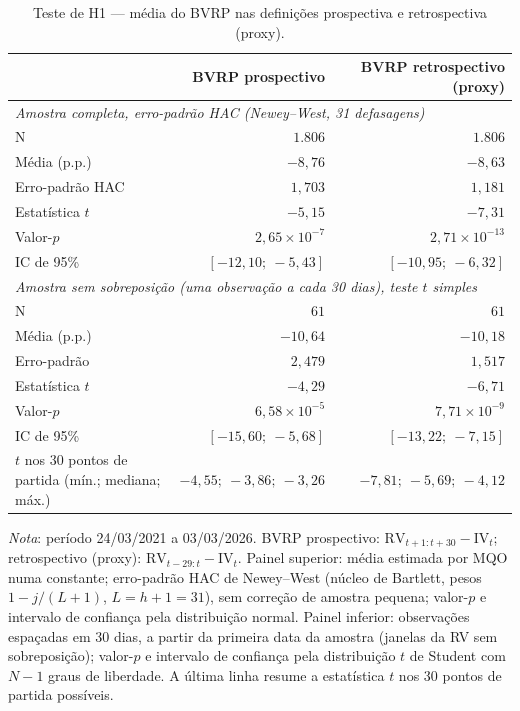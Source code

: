 \begin{table}[H]
\centering
\small
\caption{Teste de H1 --- média do BVRP nas definições prospectiva e retrospectiva (proxy).}
\label{tab:h1-teste-media}
\begin{tabular}{lrr}
\toprule
 & BVRP prospectivo & BVRP retrospectivo (proxy) \\
\midrule
\multicolumn{3}{l}{\textit{Amostra completa, erro-padrão HAC (Newey--West, 31 defasagens)}} \\
N & $1{.}806$ & $1{.}806$ \\
Média (p.p.) & $-8{,}76$ & $-8{,}63$ \\
Erro-padrão HAC & $1{,}703$ & $1{,}181$ \\
Estatística $t$ & $-5{,}15$ & $-7{,}31$ \\
Valor-$p$ & $2{,}65 \times 10^{-7}$ & $2{,}71 \times 10^{-13}$ \\
IC de 95\% & $[-12{,}10;\ -5{,}43]$ & $[-10{,}95;\ -6{,}32]$ \\
\midrule
\multicolumn{3}{l}{\textit{Amostra sem sobreposição (uma observação a cada 30 dias), teste $t$ simples}} \\
N & $61$ & $61$ \\
Média (p.p.) & $-10{,}64$ & $-10{,}18$ \\
Erro-padrão & $2{,}479$ & $1{,}517$ \\
Estatística $t$ & $-4{,}29$ & $-6{,}71$ \\
Valor-$p$ & $6{,}58 \times 10^{-5}$ & $7{,}71 \times 10^{-9}$ \\
IC de 95\% & $[-15{,}60;\ -5{,}68]$ & $[-13{,}22;\ -7{,}15]$ \\
$t$ nos 30 pontos de partida (mín.; mediana; máx.) & $-4{,}55;\ -3{,}86;\ -3{,}26$ & $-7{,}81;\ -5{,}69;\ -4{,}12$ \\
\bottomrule
\end{tabular}
\par\smallskip
\footnotesize\textit{Nota}: período 24/03/2021 a 03/03/2026. BVRP prospectivo: $\text{RV}_{t+1:t+30} - \text{IV}_t$; retrospectivo (proxy): $\text{RV}_{t-29:t} - \text{IV}_t$. Painel superior: média estimada por MQO numa constante; erro-padrão HAC de Newey--West (núcleo de Bartlett, pesos $1 - j/(L+1)$, $L = h+1 = 31$), sem correção de amostra pequena; valor-$p$ e intervalo de confiança pela distribuição normal. Painel inferior: observações espaçadas em 30 dias, a partir da primeira data da amostra (janelas da RV sem sobreposição); valor-$p$ e intervalo de confiança pela distribuição $t$ de Student com $N-1$ graus de liberdade. A última linha resume a estatística $t$ nos 30 pontos de partida possíveis.
\end{table}
